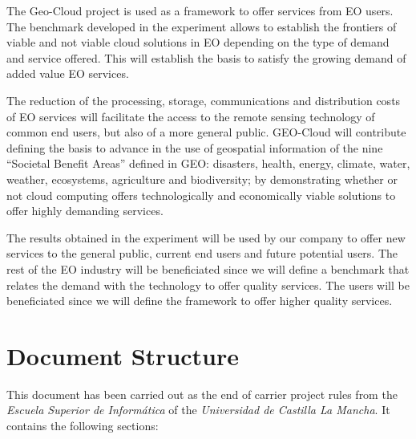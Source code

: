 The Geo-Cloud project is used as a framework to offer services from \ac{EO}
users. The benchmark developed in the experiment allows to establish the
frontiers of viable and not viable cloud solutions in \ac{EO} depending on the
type of demand and service offered. This will establish the basis to satisfy the
growing demand of added value \ac{EO} services.

The reduction of the processing, storage, communications and distribution costs
of \ac{EO} services will facilitate the access to the remote sensing technology of
common end users, but also of a more general public. GEO-Cloud will contribute
defining the basis to advance in the use of geospatial information of the nine
``Societal Benefit Areas'' defined in GEO: disasters, health, energy, climate,
water, weather, ecosystems, agriculture and biodiversity; by demonstrating
whether or not cloud computing offers technologically and economically viable
solutions to offer highly demanding services.

The results obtained in the experiment will be used by our company to offer new
services to the general public, current end users and future potential users. The
rest of the \ac{EO} industry will be beneficiated since we will define a
benchmark that relates the demand with the technology to offer quality
services. The users will be beneficiated since we will define the framework to
offer higher quality services.




\section{Document Structure}

This document has been carried out as the end of carrier project rules from the \emph{Escuela
Superior de Informática} of the \emph{Universidad de Castilla La Mancha}. It contains
the following sections:


